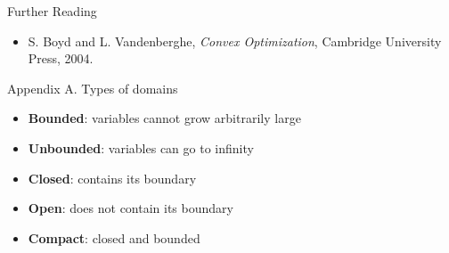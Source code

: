\documentclass{beamer}
\begin{document}
\begin{frame}{Further Reading}
	\begin{itemize}
		\item S. Boyd and L. Vandenberghe, \textit{Convex Optimization}, Cambridge University Press, 2004. 
	\end{itemize}
\end{frame}

\myqrframe


\begin{frame}{Appendix A. Types of domains}
	\begin{itemize}
		\item \textbf{Bounded}: variables cannot grow arbitrarily large
		\item \textbf{Unbounded}: variables can go to infinity
		\item \textbf{Closed}: contains its boundary
		\item \textbf{Open}: does not contain its boundary
		\item \textbf{Compact}: closed and bounded
	\end{itemize}
\end{frame}
\end{document}
